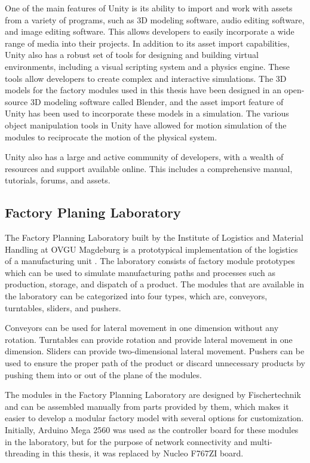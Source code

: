 One of the main features of Unity is its ability to import and work with assets from a variety of programs, such as 3D modeling software, audio editing software, and image editing software. This allows developers to easily incorporate a wide range of media into their projects. In addition to its asset import capabilities, Unity also has a robust set of tools for designing and building virtual environments, including a visual scripting system and a physics engine. These tools allow developers to create complex and interactive simulations. The 3D models for the factory modules used in this thesis have been designed in an open-source 3D modeling software called Blender, and the asset import feature of Unity has been used to incorporate these models in a simulation. The various object manipulation tools in Unity have allowed for motion simulation of the modules to reciprocate the motion of the physical system.

Unity also has a large and active community of developers, with a wealth of resources and support available online. This includes a comprehensive manual, tutorials, forums, and assets.

\subsection{Factory Planing Laboratory}
The Factory Planning Laboratory built by the Institute of Logistics and Material Handling at OVGU Magdeburg is a prototypical implementation of the logistics of a manufacturing unit \cite{lang}. The laboratory consists of factory module prototypes which can be used to simulate manufacturing paths and processes such as production, storage, and dispatch of a product. The modules that are available in the laboratory can be categorized into four types, which are, conveyors, turntables, sliders, and pushers.

Conveyors can be used for lateral movement in one dimension without any rotation. Turntables can provide rotation and provide lateral movement in one dimension. Sliders can provide two-dimensional lateral movement. Pushers can be used to ensure the proper path of the product or discard unnecessary products by pushing them into or out of the plane of the modules.

The modules in the Factory Planning Laboratory are designed by Fischertechnik \cite{fischertechnik_1965} and can be assembled manually from parts provided by them, which makes it easier to develop a modular factory model with several options for customization. Initially, Arduino Mega 2560 was used as the controller board for these modules in the laboratory, but for the purpose of network connectivity and multi-threading in this thesis, it was replaced by Nucleo F767ZI board.

